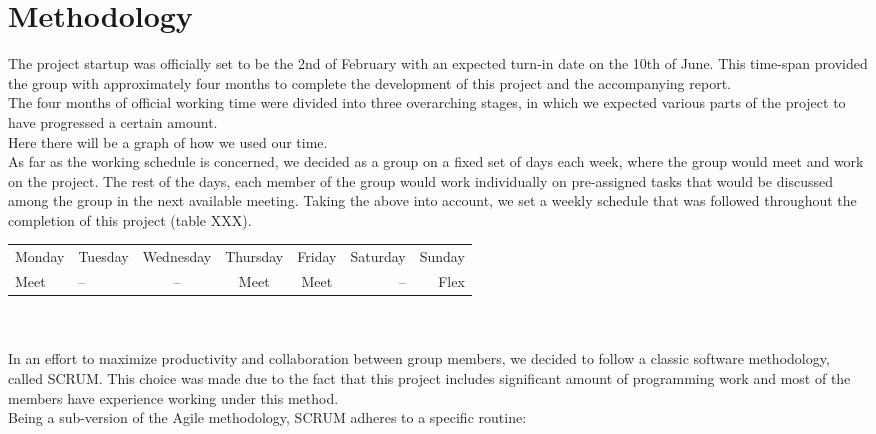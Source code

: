 
\chapter{Methodology} %

\label{ch:theory} %


The project startup was officially set to be the 2nd of February with an expected turn-in date on the 10th of June. This time-span provided the group with approximately four months to complete the development of this project and the accompanying report.\\
The four months of official working time were divided into three overarching stages, in which we expected various parts of the project to have progressed a certain amount.\\ 

Here there will be a graph of how we used our time. \\

As far as the working schedule is concerned, we decided as a group on a fixed set of days each week, where the group would meet and work on the project. The rest of the days, each member of the group would work individually on pre-assigned tasks that would be discussed among the group in the next available meeting. Taking the above into account, we set a weekly schedule that was followed throughout the completion of this project (table XXX).\\

\begin{tabular}{ l | l | c | c | c | r | r }
Monday & Tuesday & Wednesday & Thursday & Friday & Saturday & Sunday \\
Meet & -- & -- & Meet & Meet & -- & Flex

\end{tabular} \\
\\

In an effort to maximize productivity and collaboration between group members, we decided to follow a classic software methodology, called SCRUM. This choice was made due to the fact that this project includes significant amount of programming work and most of the members have experience working under this method. \\
Being a sub-version of the Agile methodology, SCRUM adheres to a specific routine:

